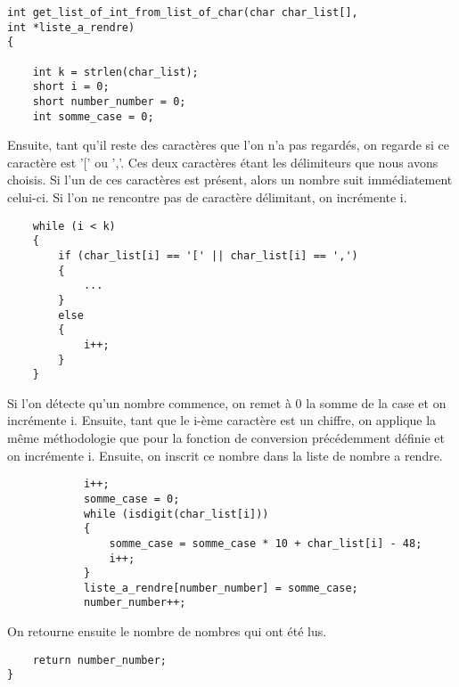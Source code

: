 \documentclass[a4paper, 12pt]{article}
\begin{document}
                
                
                
                                \begin{lstlisting}
int get_list_of_int_from_list_of_char(char char_list[], 
int *liste_a_rendre)
{

    int k = strlen(char_list);
    short i = 0;
    short number_number = 0;
    int somme_case = 0;
                \end{lstlisting}
                Ensuite, tant qu'il reste des caractères que l'on n’a pas regardés, on regarde si ce caractère est '[' ou ','. Ces deux caractères étant les délimiteurs que nous avons choisis. Si l'un de ces caractères est présent, alors un nombre suit immédiatement celui-ci. Si l'on ne rencontre pas de caractère délimitant, on incrémente i.
                
                        \begin{lstlisting}
    while (i < k)
    {
        if (char_list[i] == '[' || char_list[i] == ',') 
        {
            ...
        }
        else
        {
            i++;
        }
    }
                \end{lstlisting}
                Si l'on détecte qu'un nombre commence, on remet à 0 la somme de la case et on incrémente i.
                Ensuite, tant que le i-ème caractère est un chiffre, on applique la même méthodologie que pour la fonction de conversion précédemment définie et on incrémente i.
                Ensuite, on inscrit ce nombre dans la liste de nombre a rendre.
                
                
                                        \begin{lstlisting}
            i++;
            somme_case = 0;
            while (isdigit(char_list[i]))
            {
                somme_case = somme_case * 10 + char_list[i] - 48; 
                i++;
            }
            liste_a_rendre[number_number] = somme_case;
            number_number++;
                \end{lstlisting}
                
                On retourne ensuite le nombre de nombres qui ont été lus.
                
                
                                                       \begin{lstlisting}
    return number_number;
}
                \end{lstlisting}
\end{document}
